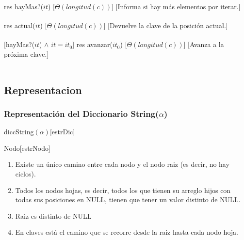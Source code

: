  {res \igobs hayMas?($it$)}%
  [$\Theta(longitud(c))$] %
  [Informa si hay m\'as elementos por iterar.]\\\\

  {res \igobs actual($it$)}
  [$\Theta(longitud(c))$]%
  [Devuelve la clave de la posici\'on actual.]\\\\

  [hayMas?($it$) $\land$ $it = it_{0}$] %
  {res \igobs avanzar($it_{0}$)}
  [$\Theta(longitud(c))$]%
  [Avanza a la pr\'oxima clave.]\\\\


\subsection{Representacion}
  
  \subsubsection{Representaci\'on del Diccionario String($\alpha$)}
  \begin{Estructura}{diccString$(\alpha)$}[estrDic]
    \begin{Tupla}[estrDic]
    \end{Tupla}
\end{Estructura}

  \begin{Estructura}{Nodo}[estrNodo]
    \begin{Tupla}[estrNodo]
    \end{Tupla}
\end{Estructura}


\renewcommand{\labelenumi}{(\Roman{enumi})}
 \begin{enumerate}
 	\item Existe un \'unico camino entre cada nodo y el nodo raiz (es decir, no hay ciclos).
 	\item Todos los nodos hojas, es decir, todos los que tienen su arreglo hijos con todas sus posiciones en NULL, tienen que tener un valor distinto de NULL.
 	\item Raiz es distinto de NULL
 	\item En claves est\'a el camino que se recorre desde la raiz hasta cada nodo hoja.
  \end{enumerate}

